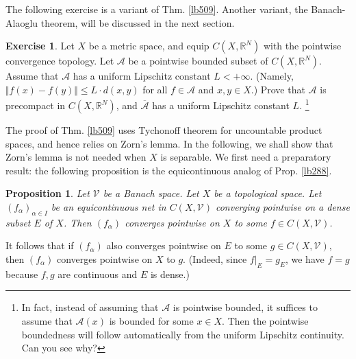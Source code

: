 \documentclass[12pt,b5paper,notitlepage]{article}
\theoremstyle{definition}
\newtheorem{exe}[df]{Exercise}
\newtheorem{rem}[df]{Remark}
\theoremstyle{plain}
\newtheorem{pp}[df]{Proposition}
\newcommand{\mc}{\mathcal}
\newcommand{\ovl}{\overline}
\newcommand{\scr}{\mathscr}
\newcommand{\Rbb}{\mathbb R}
\newcommand{\Cl}{\mathrm{Cl}}
\numberwithin{equation}{section}
\begin{document}
\begin{comment}
\begin{rem}
In the above theorem, one can also prove that $\scr A$ is precompact without using Cor. \ref{lb508}: As in the above proof, we have $\scr A\subset S=\prod_{x\in X}K_x$ where $S$ is compact. So $\Cl_S(\scr A)$ is compact. Thus $\scr A$ is precompact in $C(X,Y)$ if we can prove that $\Cl_S(\scr A)$ is a subset of $C(X,Y)$. But this follows immediately from Cor. \ref{lb303}, or from the last paragraph of the above proof.
\end{rem}
\end{comment}


The following exercise is a variant of Thm. \ref{lb509}. Another variant, the Banach-Alaoglu theorem, will be discussed in the next section.



\begin{exe}\label{lb536}
Let $X$ be a metric space, and equip $C(X,\Rbb^N)$ with the pointwise convergence topology. Let $\scr A$ be a pointwise bounded subset of $C(X,\Rbb^N)$. Assume that $\scr A$ has a uniform Lipschitz constant $L<+\infty$. (Namely, $\Vert f(x)-f(y)\Vert\leq L\cdot d(x,y)$ for all $f\in\scr A$ and $x,y\in X$.) Prove that $\scr A$ is precompact in $C(X,\Rbb^N)$, and $\ovl{\scr A}$ has a uniform Lipschitz constant $L$. \footnote{In fact, instead of assuming that $\scr A$ is pointwise bounded, it suffices to assume that $\scr A(x)$ is bounded for some $x\in X$. Then the pointwise boundedness will follow automatically from the uniform Lipschitz continuity. Can you see why?}
\end{exe}



The proof of Thm. \ref{lb509} uses Tychonoff theorem for uncountable product spaces, and hence relies on Zorn's lemma. In the following, we shall show that Zorn's lemma is not needed when $X$ is separable. We first need a preparatory result: the following proposition is the equicontinuous analog of Prop. \ref{lb288}.



\begin{pp}\label{lb511}
Let $\mc V$ be a Banach space. Let $X$ be a topological space. Let $(f_\alpha)_{\alpha\in I}$ be an equicontinuous net in $C(X,\mc V)$ converging pointwise on a dense subset $E$ of $X$. Then $(f_\alpha)$ converges pointwise on $X$ to some $f\in C(X,\mc V)$.
\end{pp}

It follows that if $(f_\alpha)$ also converges pointwise on $E$ to some $g\in C(X,\mc V)$, then $(f_\alpha)$ converges pointwise on $X$ to $g$. (Indeed, since $f|_E=g_E$, we have $f=g$ because $f,g$ are continuous and $E$ is dense.)  
\end{document}
